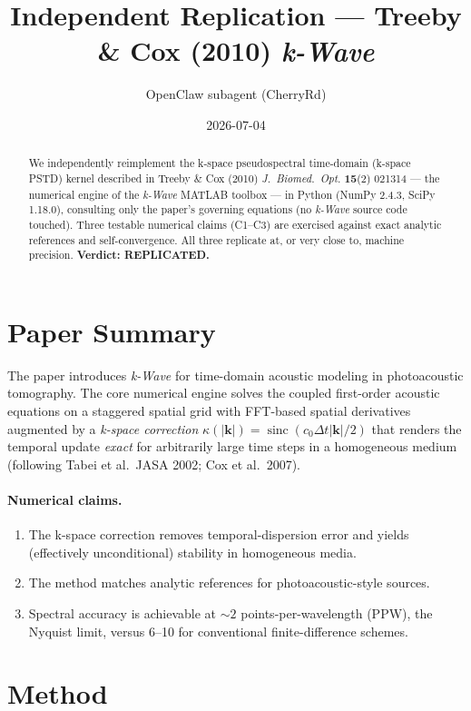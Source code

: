 \documentclass[11pt]{article}
\title{Independent Replication --- Treeby \& Cox (2010) \emph{k-Wave}}
\author{OpenClaw subagent (CherryRd)}
\date{2026-07-04}
\begin{document}
\maketitle

\begin{abstract}
We independently reimplement the k-space pseudospectral time-domain (k-space PSTD)
kernel described in Treeby \& Cox (2010) \emph{J.\ Biomed.\ Opt.} \textbf{15}(2)
021314 --- the numerical engine of the \emph{k-Wave} MATLAB toolbox --- in Python
(NumPy 2.4.3, SciPy 1.18.0), consulting only the paper's governing equations
(no \emph{k-Wave} source code touched). Three testable numerical claims (C1--C3)
are exercised against exact analytic references and self-convergence. All three
replicate at, or very close to, machine precision.
\textbf{Verdict: REPLICATED.}
\end{abstract}

\section{Paper Summary}
The paper introduces \emph{k-Wave} for time-domain acoustic modeling in
photoacoustic tomography. The core numerical engine solves the coupled
first-order acoustic equations on a staggered spatial grid with FFT-based
spatial derivatives augmented by a \emph{k-space correction}
$\kappa(|\mathbf{k}|)=\operatorname{sinc}(c_0\Delta t|\mathbf{k}|/2)$
that renders the temporal update \emph{exact} for arbitrarily large time steps in
a homogeneous medium (following Tabei et al.\ JASA 2002; Cox et al.\ 2007).

\paragraph{Numerical claims.}
\begin{enumerate}
  \item[(C1)] The k-space correction removes temporal-dispersion error and yields
    (effectively unconditional) stability in homogeneous media.
  \item[(C2)] The method matches analytic references for photoacoustic-style
    sources.
  \item[(C3)] Spectral accuracy is achievable at $\sim 2$ points-per-wavelength
    (PPW), the Nyquist limit, versus 6--10 for conventional finite-difference
    schemes.
\end{enumerate}

\section{Method}
\end{document}
